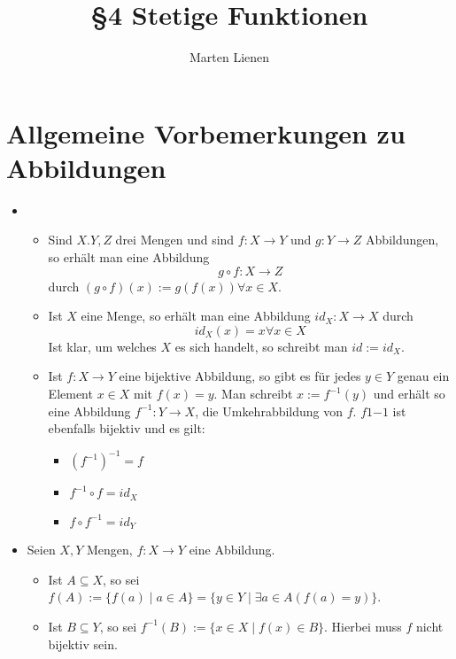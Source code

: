 \documentclass[a4paper,10pt]{article}
\title{§4 Stetige Funktionen}
\author{Marten Lienen}
\begin{document}
\maketitle

\section{Allgemeine Vorbemerkungen zu Abbildungen}

\begin{itemize}
 \item 
 \begin{itemize}
  \item Sind $X. Y, Z$ drei Mengen und sind $f: X \rightarrow Y$ und $g: Y \rightarrow Z$ Abbildungen, so erhält man eine Abbildung
  \begin{equation}
   g \circ f: X \rightarrow Z
  \end{equation}
  durch $(g \circ f)(x) := g(f(x)) \forall x \in X$.
 
  \item Ist $X$ eine Menge, so erhält man eine Abbildung $id_X: X \rightarrow X$ durch
  \begin{equation}
   id_X(x) = x \forall x \in X
  \end{equation}
  Ist klar, um welches $X$ es sich handelt, so schreibt man $id := id_X$.
 
  \item Ist $f: X \rightarrow Y$ eine bijektive Abbildung, so gibt es für jedes $y \in Y$ genau ein Element $x \in X$ mit $f(x) = y$.
  Man schreibt $x := f^{-1}(y)$ und erhält so eine Abbildung $f^{-1}: Y \rightarrow X$, die Umkehrabbildung von $f$.
  $f1{-1}$ ist ebenfalls bijektiv und es gilt:
  \begin{itemize}
   \item $(f^{-1})^{-1} = f$
   \item $f^{-1} \circ f = id_X$
   \item $f \circ f^{-1} = id_Y$
  \end{itemize}
 \end{itemize}

 \item Seien $X, Y$ Mengen, $f: X \rightarrow Y$ eine Abbildung.
 \begin{itemize}
  \item Ist $A \subseteq X$, so sei $f(A) := \{f(a) \mid a \in A\} = \{y \in Y \mid \exists a \in A (f(a) = y)\}$.
  
  \item Ist $B \subseteq Y$, so sei $f^{-1}(B) := \{x \in X \mid f(x) \in B \}$. Hierbei muss $f$ nicht bijektiv sein.
  

\end{itemize}
\end{itemize}
\end{document}

